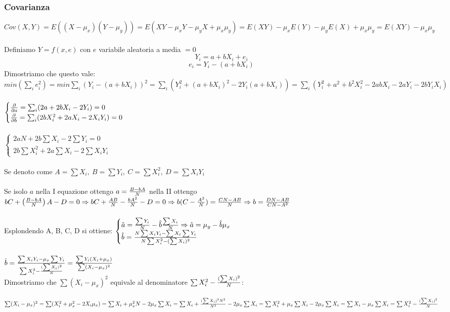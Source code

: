 \documentclass[12pt,a4paper]{article}
\begin{document}
\subsubsection{Covarianza}
$Cov(X,Y) = E((X-\mu_x)(Y-\mu_y)) = E(XY - \mu_xY - \mu_yX +\mu_x\mu_y)= E(XY) - \mu_xE(Y) -\mu_y E(X) + \mu_x\mu_y = E(XY) - \mu_x\mu_y$\\
\\
Definiamo $Y=f(x,e)$ con $e$ variabile aleatoria a media $= 0$\\
$$Y_i = a+bX_i + e_i$$ $$e_i = Y_i -(a+bX_i)$$
Dimostriamo che questo vale:
$min(\sum_i e_i^2) = min \sum_i (Y_i -(a+bX_i))^2 = \sum_i (Y_i^2 +(a+bX_i)^2 - 2Y_i(a+bX_i)) = \sum_i(Y_i^2+a^2+b^2X_i^2 - 2abX_i - 2aY_i -2bY_iX_i)$\\
\\
$\begin{cases}
{\partial \over \partial a} = \sum_i (2a+2bX_i - 2Y_i) = 0\\
{\partial \over \partial b} = \sum_i (2bX_i^2 +2aX_i - 2X_iY_i) = 0\\
\end{cases}$\\
\\
$\begin{cases}
2aN + 2b\sum X_i - 2 \sum Y_i = 0\\
2b \sum X_i^2 + 2a \sum X_i - 2 \sum X_iY_i
\end{cases}$\\
\\
Se denoto come $A = \sum X_i, \ B = \sum Y_i, \ C = \sum X_i^2, \ D = \sum X_iY_i$\\
\\
Se isolo $a$ nella I equazione ottengo $a={B-bA \over N}$ nella II ottengo $bC + \left({B-bA \over N}\right)A - D = 0 \Rightarrow bC + {AB \over N} - {bA^2 \over N} - D = 0 \Rightarrow b(C-{A^2 \over N}) = {CN - AB \over N} \Rightarrow b={DN - AB \over CN - A^2}$\\
\\
Esplondendo A, B, C, D si ottiene: \label{reg_lin}
$\begin{cases}
\hat a = {\sum Y_i \over N} - \hat b {\sum X_i \over N} \Rightarrow \hat a = \mu_y - \hat b \mu_x\\
\hat b = {N \sum X_iY_i - \sum X_i \sum Y_i \over N \sum X_i^2 - (\sum X_i)^2}
\end{cases}$\\
\\
$\hat b = {\sum X_iY_i - \mu_x \sum Y_i \over \sum X_i^2 - {(\sum X_i)^2 \over N}} = {\sum Y_i (X_i + \mu_x) \over \sum (X_i - \mu_x)^2}$\\
Dimostriamo che $\sum (X_i - \mu_x)^2$ equivale al denominatore $\sum X_i^2 - {(\sum X_i)^2 \over N}$:\\
\\
$\sum (X_i - \mu_x)^2 = \sum (X_i^2 + \mu_x^2 - 2X_i\mu_x) = \sum X_i+ \mu_x^2N - 2 \mu_x \sum X_i = \sum X_i + {(\sum X_i)^2 N^2 \over N^2} - 2 \mu_x \sum X_i = \sum X_i^2 + \mu_x\sum X_i - 2\mu_x\sum X_i = \sum X_i - \mu_x \sum X_i = \sum X_i^2 - {(\sum X_i)^2 \over N}$
\end{document}
